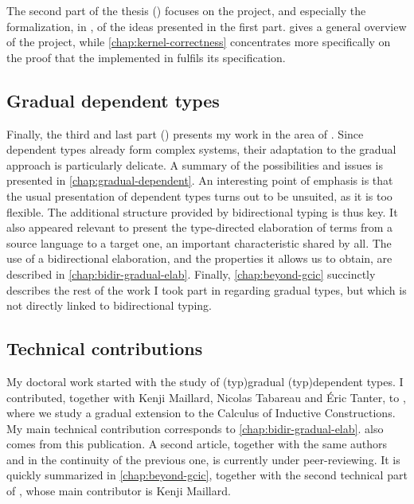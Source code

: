 The second part of the thesis () focuses on the  project,
and especially the formalization, in , of the ideas presented in the first part.
 gives a general overview of the project, while
\cref{chap:kernel-correctness} concentrates more specifically on the proof that the
 implemented in  fulfils its specification.

\subsection{Gradual dependent types}

Finally, the third and last part () presents my work in the area
of . Since dependent types already form complex systems, their adaptation
to the gradual approach is particularly delicate. A summary of the possibilities and issues is
presented in \cref{chap:gradual-dependent}. An interesting point of emphasis is that the
usual presentation of dependent types turns out to be unsuited, as it is too flexible.
The additional structure provided by bidirectional typing is thus key. It also
appeared relevant to present the type-directed elaboration of terms from a source language
to a target one, an important characteristic shared by all.
The use of a bidirectional elaboration, and the properties it allows us to obtain, are described
in \cref{chap:bidir-gradual-elab}. Finally, \cref{chap:beyond-gcic} succinctly describes the
rest of the work I took part in regarding gradual types, but which is not directly
linked to bidirectional typing.

\subsection{Technical contributions}

My doctoral work started with the study of \kl(typ){gradual}
\kl(typ){dependent} types.
I contributed, together with Kenji Maillard, Nicolas Tabareau and Éric Tanter, to
, where we study a gradual extension to the
Calculus of Inductive Constructions. My main technical contribution corresponds
to \cref{chap:bidir-gradual-elab}.  also comes from this
publication. A second article, together with the same authors and in the continuity of the
previous one, is currently under peer-reviewing. It is quickly summarized in
\cref{chap:beyond-gcic}, together with the second technical part of
\textcite{LennonBertrand2022}, whose main contributor is Kenji Maillard.

